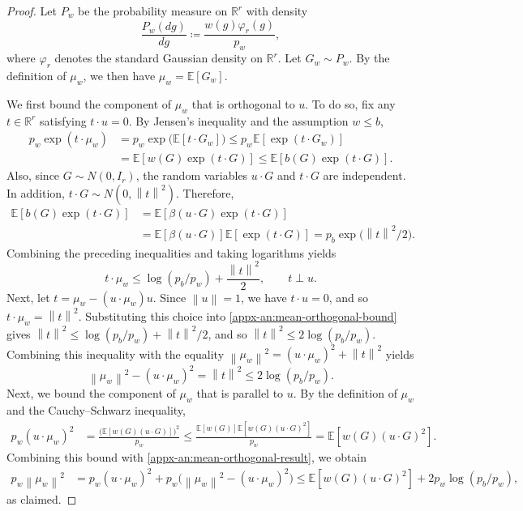 \documentclass[11pt,letterpaper]{article}
\theoremstyle{remark}
\newcommand{\E}{\mathbb E}
\newcommand{\R}{\mathbb R}
\newcommand{\norm}[1]{\left\lVert#1\right\rVert}
\begin{document}
\begin{proof}
Let $P_w$ be the probability measure on $\R^r$ with density
\[
\frac{P_w(dg)}{dg}\coloneqq \frac{w(g)\varphi_r(g)}{p_w},
\]
where $\varphi_r$ denotes the standard Gaussian density
on $\R^r$. Let $G_w\sim P_w$. By the definition of
$\mu_w$, we then have $\mu_w=\E[G_w]$.

We first bound the component of $\mu_w$ that is orthogonal to $u$. To do so, fix any \(t\in\R^r\) satisfying \(t\cdot u=0\).
By Jensen's inequality and the assumption \(w\le b\),
\begin{align*}
p_w\exp(t\cdot\mu_w)
&=p_w\exp\bigl(\E[t\cdot G_w]\bigr)
\le p_w\E[\exp(t\cdot G_w)]\\
&=\E[w(G)\exp(t\cdot G)]
\le\E[b(G)\exp(t\cdot G)].
\end{align*}
Also, since \(G\sim N(0,I_r)\),
the random variables \(u\cdot G\) and \(t\cdot G\)
are independent. In addition, \(t\cdot G\sim N(0,\norm{t}^2)\). Therefore,
\begin{align*}
\E[b(G)\exp(t\cdot G)]
&=\E[\beta(u\cdot G)\exp(t\cdot G)]\\
&=\E[\beta(u\cdot G)]\E[\exp(t\cdot G)]
=p_b\exp\bigl(\norm{t}^2/2\bigr).
\end{align*}
Combining the preceding inequalities and taking
logarithms yields
\begin{equation}
t\cdot\mu_w
\le \log(p_b/p_w)+\frac{\norm{t}^2}{2},
\qquad t\perp u.
\label{appx-an:mean-orthogonal-bound}
\end{equation}
Next, let $t=\mu_w-(u\cdot\mu_w)u$.
Since \(\norm{u}=1\), we have \(t\cdot u=0\), and so
$ t\cdot\mu_w =\norm{t}^2$.
Substituting this choice into
\eqref{appx-an:mean-orthogonal-bound} gives
$\norm{t}^2 \le \log(p_b/p_w)+\norm{t}^2/2$, and so $\norm{t}^2\leq 2\log(p_b/p_w)$.
Combining this inequality with the equality $\norm{\mu_w}^2 = (u\cdot\mu_w)^2 + \norm{t}^2$ yields
\begin{equation}
\norm{\mu_w}^2-(u\cdot\mu_w)^2
=\norm{t}^2
\le 2\log(p_b/p_w).
\label{appx-an:mean-orthogonal-result}
\end{equation}
Next, we bound the component of $\mu_w$ that is parallel to \(u\). By the definition of \(\mu_w\)
and the Cauchy--Schwarz inequality,
\begin{align*}
p_w(u\cdot\mu_w)^2
&=\frac{\bigl(\E[w(G)(u\cdot G)]\bigr)^2}{p_w}
\le
\frac{\E[w(G)]\E[w(G)(u\cdot G)^2]}{p_w}
=\E[w(G)(u\cdot G)^2].
\end{align*}
Combining this bound with \eqref{appx-an:mean-orthogonal-result},
we obtain
\begin{align*}
p_w\norm{\mu_w}^2
&=p_w(u\cdot\mu_w)^2
 +p_w\bigl(\norm{\mu_w}^2-(u\cdot\mu_w)^2\bigr)
 \le \E[w(G)(u\cdot G)^2]
 +2p_w\log(p_b/p_w),
\end{align*}
as claimed.
\end{proof}
\end{document}
